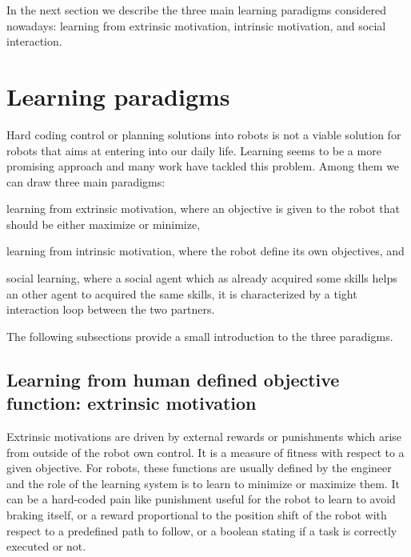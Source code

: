 
\transition

In the next section we describe the three main learning paradigms considered nowadays: learning from extrinsic motivation, intrinsic motivation, and social interaction.

\section{Learning paradigms}

Hard coding control or planning solutions into robots is not a viable solution for robots that aims at entering into our daily life. Learning seems to be a more promising approach and many work have tackled this problem. Among them we can draw three main paradigms: \begin{inparaenum}[(a)] \item learning from extrinsic motivation, where an objective is given to the robot that should be either maximize or minimize, \item learning from intrinsic motivation, where the robot define its own objectives, and \item social learning, where a social agent which as already acquired some skills helps an other agent to acquired the same skills, it is characterized by a tight interaction loop between the two partners. \end{inparaenum} The following subsections provide a small introduction to the three paradigms.

\subsection{Learning from human defined objective function: extrinsic motivation}

Extrinsic motivations are driven by external rewards or punishments which arise from outside of the robot own control. It is a measure of fitness with respect to a given objective. For robots, these functions are usually defined by the engineer and the role of the learning system is to learn to minimize or maximize them. It can be a hard-coded pain like punishment useful for the robot to learn to avoid braking itself, or a reward proportional to the position shift of the robot with respect to a predefined path to follow, or a boolean stating if a task is correctly executed or not.

